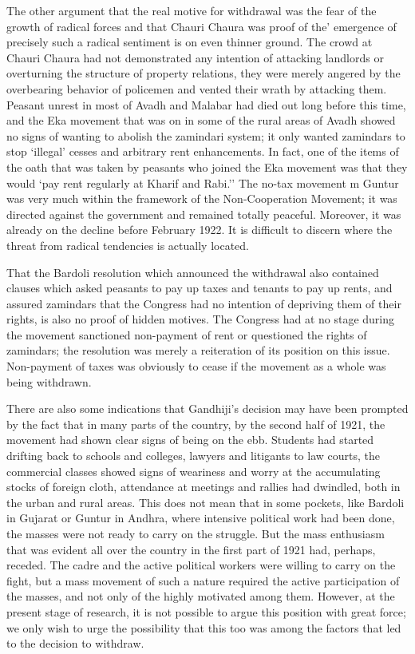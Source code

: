 The other argument that the real motive for withdrawal was the fear of the growth of radical forces and that Chauri Chaura was proof of the' emergence of precisely such a radical sentiment is on even thinner ground. The crowd at Chauri Chaura had not demonstrated any intention of attacking landlords or overturning the structure of property relations, they were merely angered by the overbearing behavior of policemen and vented their wrath by attacking them. Peasant unrest in most of Avadh and Malabar had died out long before this time, and the Eka movement that was on in some of the rural areas of Avadh showed no signs of wanting to abolish the zamindari system; it only wanted zamindars to stop `illegal' cesses and arbitrary rent enhancements. In fact, one of the items of the oath that was taken by peasants who joined the Eka movement was that they would `pay rent regularly at Kharif and Rabi.'' The no-tax movement m Guntur was very much within the framework of the Non-Cooperation Movement; it was directed against the government and remained totally peaceful. Moreover, it was already on the decline before February 1922. It is difficult to discern where the threat from radical tendencies is actually located. 

That the Bardoli resolution which announced the withdrawal also contained clauses which asked peasants to pay up taxes and tenants to pay up rents, and assured zamindars that the Congress had no intention of depriving them of their rights, is also no proof of hidden motives. The Congress had at no stage during the movement sanctioned non-payment of rent or questioned the rights of zamindars; the resolution was merely a reiteration of its position on this issue. Non-payment of taxes was obviously to cease if the movement as a whole was being withdrawn. 

There are also some indications that Gandhiji's decision may have been prompted by the fact that in many parts of the country, by the second half of 1921, the movement had shown clear signs of being on the ebb. Students had started drifting back to schools and colleges, lawyers and litigants to law courts, the commercial classes showed signs of weariness and worry at the accumulating stocks of foreign cloth, attendance at meetings and rallies had dwindled, both in the urban and rural areas. This does not mean that in some pockets, like Bardoli in Gujarat or Guntur in Andhra, where intensive political work had been done, the masses were not ready to carry on the struggle. But the mass enthusiasm that was evident all over the country in the first part of 1921 had, perhaps, receded. The cadre and the active political workers were willing to carry on the fight, but a mass movement of such a nature required the active participation of the masses, and not only of the highly motivated among them. However, at the present stage of research, it is not possible to argue this position with great force; we only wish to urge the possibility that this too was among the factors that led to the decision to withdraw. 

